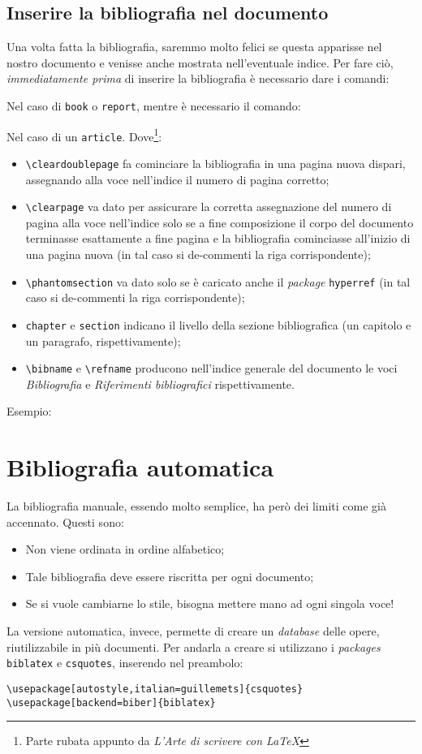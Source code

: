 \subsection{Inserire la bibliografia nel documento}
Una volta fatta la bibliografia, saremmo molto felici se questa apparisse
nel nostro documento e venisse anche mostrata nell'eventuale indice. Per fare
ciò, \emph{immediatamente prima} di inserire la bibliografia è necessario dare
i comandi:

Nel caso di \verb!book! o \verb!report!, mentre è necessario il comando:

Nel caso di un \verb!article!. Dove\footnote{Parte rubata appunto da
\textit{L'Arte di scrivere con \LaTeX{}}}:
\begin{itemize}
    \item \verb!\cleardoublepage! fa cominciare la bibliografia in una pagina
    nuova dispari, assegnando alla voce nell’indice il numero di pagina
    corretto;
    \item \verb!\clearpage! va dato per assicurare la corretta assegnazione
    del numero di pagina alla voce nell’indice solo se a fine composizione il
    corpo del documento terminasse esattamente a fine pagina e la bibliografia
    cominciasse all’inizio di una pagina nuova (in tal caso si de-commenti la
    riga corrispondente);
    \item \verb!\phantomsection! va dato solo se è caricato anche il
    \textit{package} \verb!hyperref! (in tal caso si de-commenti la riga
    corrispondente);
    \item \verb!chapter! e \verb!section! indicano il livello della sezione
    bibliografica (un capitolo e un paragrafo, rispettivamente);
    \item \verb!\bibname! e \verb!\refname! producono nell’indice generale del
    documento le voci \emph{Bibliografia} e \emph{Riferimenti bibliografici}
    rispettivamente.
\end{itemize}
Esempio:



\section{Bibliografia automatica}
La bibliografia manuale, essendo molto semplice, ha però dei limiti come già
accennato. Questi sono:
\begin{itemize}
    \item Non viene ordinata in ordine alfabetico;
    \item Tale bibliografia deve essere riscritta per ogni documento;
    \item Se si vuole cambiarne lo stile, bisogna mettere mano ad ogni singola
    voce!
\end{itemize}
La versione automatica, invece, permette di creare un \textit{database} delle
opere, riutilizzabile in più documenti. Per andarla a creare si utilizzano i
\textit{packages} \texttt{biblatex} e \texttt{csquotes}, inserendo nel
preambolo:
\begin{lstlisting}
\usepackage[autostyle,italian=guillemets]{csquotes}
\usepackage[backend=biber]{biblatex}
\end{lstlisting}

